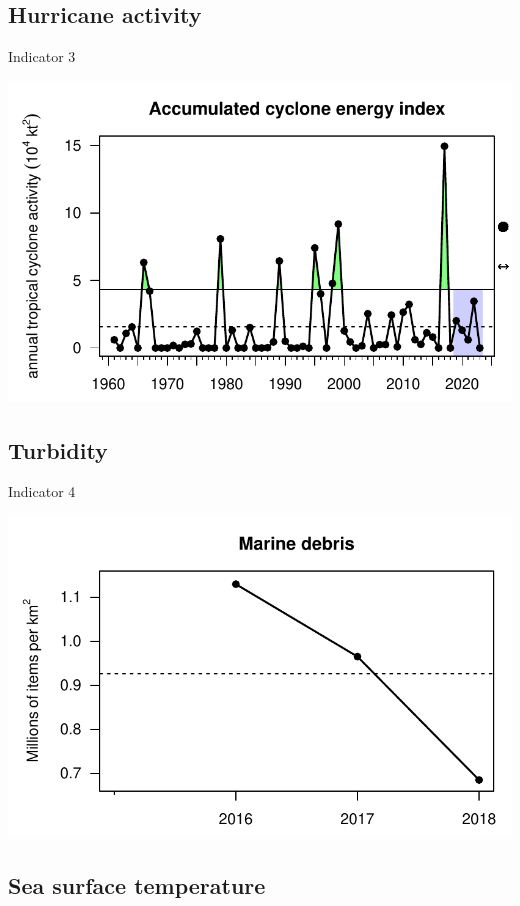 \documentclass[
  letterpaper,
  oneside,
  open=any]{scrbook}
\begin{document}
\subsection{Hurricane activity}\label{hurricane-activity}

Indicator 3

\includegraphics{Report_book_files/Risk_indicators_files/figure-pdf/unnamed-chunk-4-1.pdf}

\subsection{Turbidity}\label{turbidity}

Indicator 4

\includegraphics{Report_book_files/Risk_indicators_files/figure-pdf/unnamed-chunk-5-1.pdf}

\subsection{Sea surface temperature}\label{sea-surface-temperature}
\end{document}
